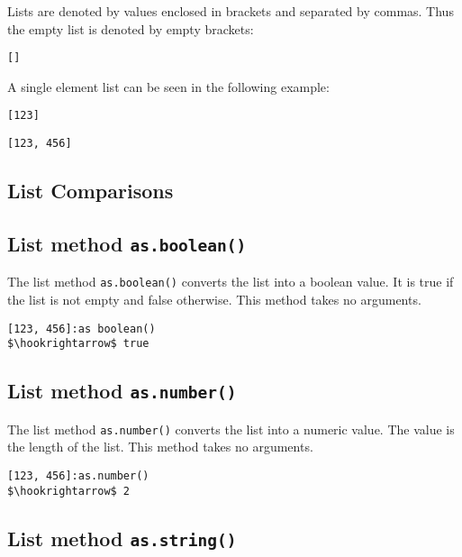 \documentclass[11pt,a4paper]{scrbook}
\begin{document}
Lists are denoted by values enclosed in brackets and separated by commas.
Thus the empty list is denoted by empty brackets:

\begin{lstlisting}[language=BibTool,mathescape=true]
[]
\end{lstlisting}

A single element list can be seen in the following example:

\begin{lstlisting}[language=BibTool,mathescape=true]
[123]
\end{lstlisting}

\begin{lstlisting}[language=BibTool,mathescape=true]
[123, 456]
\end{lstlisting}


\subsection{List Comparisons}



\subsection{List method \texttt{as.boolean()}}

The list method \texttt{as.boolean()} converts the list into a boolean value.
It is true if the list is not empty and false otherwise. This method takes no
arguments.

\begin{lstlisting}[language=BibTool,mathescape=true]
[123, 456]:as boolean()
$\hookrightarrow$ true
\end{lstlisting}

\subsection{List method \texttt{as.number()}}

The list method \texttt{as.number()} converts the list into a numeric value.
The value is the length of the list. This method takes no arguments.

\begin{lstlisting}[language=BibTool,mathescape=true]
[123, 456]:as.number()
$\hookrightarrow$ 2
\end{lstlisting}

\subsection{List method \texttt{as.string()}}
\end{document}
